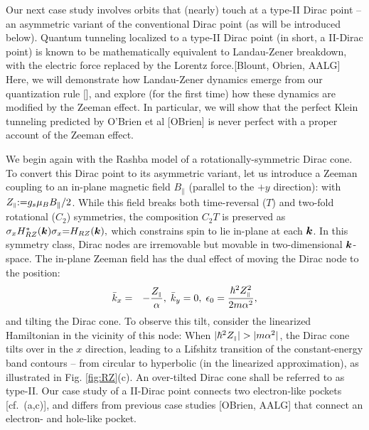 \documentclass[aps, prb, showpacs, twocolumn, notitlepage, superscriptaddress]{revtex4-1}
\begin{document}
Our next case study involves orbits that (nearly) touch at a type-II Dirac point -- an asymmetric variant of the conventional Dirac point (as will be introduced below). Quantum tunneling localized to a type-II Dirac point  (in short, a II-Dirac point) is known to be mathematically equivalent to  Landau-Zener breakdown, with the electric force replaced by the Lorentz force.[Blount, Obrien, AALG] Here, we will demonstrate how  Landau-Zener dynamics emerge from our quantization rule [], and explore (for the first time) how these dynamics are modified by the Zeeman effect. In particular, we will show that the perfect Klein tunneling predicted by O'Brien et al [OBrien] is never perfect with a proper account of the Zeeman effect. 

We begin again with the Rashba model of a rotationally-symmetric Dirac cone. To convert this Dirac point to its asymmetric variant, 
let us introduce a Zeeman coupling to an in-plane magnetic field $B_\parallel$ (parallel to the $+y$ direction):
with $Z_{\scriptscriptstyle{\parallel}}{:}{=}{g_s}\mu_B B_{\parallel}/2$.
While this field breaks both time-reversal ($T$) and two-fold rotational ($C_2$) symmetries, the composition $C_2T$ is preserved as $\sigma_x H^*_{RZ}(\boldsymbol{k})\sigma_x{=}H_{RZ}(\boldsymbol{k}),$ which constrains spin to lie in-plane at each $\boldsymbol{k}$. In this symmetry class, Dirac nodes are irremovable but movable   in two-dimensional $\boldsymbol{k}$-space. The in-plane Zeeman field has the dual effect of  moving the Dirac node  to the position:
\begin{eqnarray}
\bar{k}_x & = & -\frac{Z_{\scriptscriptstyle{\parallel}}}{\alpha},\;\bar{k}_y=0,\;\epsilon_{0}=\frac{{\hbar^2}Z_{\scriptscriptstyle{\parallel}}^{2}}{2m\alpha^2},\label{whereisdiracpoint}
\end{eqnarray}
and tilting the Dirac cone. To observe this tilt, consider the linearized Hamiltonian in the vicinity of this node: 
When $|\hbar^2\zpar|>|m\alpha^2|$, the Dirac cone tilts over in the $x$ direction, leading to a Lifshitz transition  of the constant-energy band contours -- from circular to hyperbolic (in the linearized approximation), as illustrated in Fig. \ref{fig:RZ}(c). An over-tilted Dirac cone shall be referred to as type-II. Our case study of a II-Dirac point  connects  two electron-like  pockets [cf.\ (a,c)], and  differs from previous case studies [OBrien, AALG] that connect an electron- and hole-like pocket.
\end{document}
